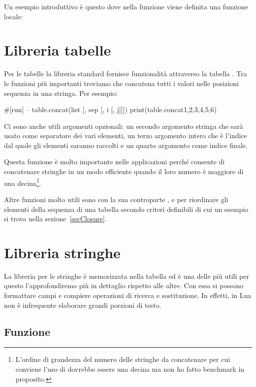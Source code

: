 Un esempio introduttivo è questo dove nella funzione  viene definita una
funzione locale:


\section{Libreria tabelle}

Per le tabelle la libreria standard fornisce funzionalità attraverso la tabella
. Tra le funzioni più importanti troviamo
 che concatena tutti i valori nelle
posizioni sequenza in una stringa. Per esempio:
\begin{lines}
#[run]
-- table.concat(list [, sep [, i [, j]]])
print(table.concat{1,2,3,4,5,6})
\end{lines}

Ci sono anche utili argomenti opzionali: un secondo argomento stringa che sarà
usato come separatore dei vari elementi, un terzo argomento intero che è
l'indice dal quale gli elementi saranno raccolti e un quarto argomento come
indice finale.

Questa funzione è molto importante nelle applicazioni perché consente di
concatenare stringhe in un modo efficiente quando il loro numero è maggiore di
una decina\footnote{L'ordine di grandezza del numero delle stringhe da
concatenare per cui conviene l'uso di  dovrebbe essere una
decina ma non ho fatto benchmark in proposito.}.

Altre funzioni molto utili sono  con la
sua controparte , e
 per riordinare gli elementi della sequenza di
una tabella secondo criteri definibili di cui un esempio si trova nella
sezione~\ref{secClosure}.


\section{Libreria stringhe}

La libreria per le stringhe è memorizzata nella tabella  ed è una
delle più utili per questo l'approfondiremo più in dettaglio rispetto alle
altre. Con essa si possono formattare campi e compiere operazioni di ricerca e
sostituzione. In effetti, in Lua non è infrequente elaborare grandi porzioni di
testo.


\subsection{Funzione }
\label{secFondStringFormat}

